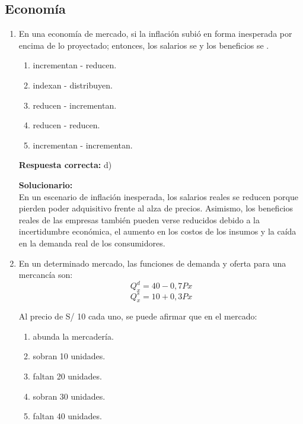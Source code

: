 \subsection*{Economía}

\begin{enumerate}
	
\item En una economía de mercado, si la inflación subió en forma inesperada por encima de lo proyectado; entonces, los salarios se \underline{\hspace{2cm}} y los beneficios se \underline{\hspace{2cm}}.

\begin{enumerate}[label=\alph*)]
	\item incrementan - reducen.
	\item indexan - distribuyen.
	\item reducen - incrementan.
	\item reducen - reducen.
	\item incrementan - incrementan.
\end{enumerate}

\textbf{Respuesta correcta:} d)

\vspace{2mm}
\textbf{Solucionario:}\\

En un escenario de inflación inesperada, los salarios reales se reducen porque pierden poder adquisitivo frente al alza de precios. Asimismo, los beneficios reales de las empresas también pueden verse reducidos debido a la incertidumbre económica, el aumento en los costos de los insumos y la caída en la demanda real de los consumidores.

\vspace{6mm}

\item En un determinado mercado, las funciones de demanda y oferta para una mercancía son:
\[ Q_x^d = 40 - 0,7Px \]
\[ Q_x^s = 10 + 0,3Px \]

Al precio de S/ 10 cada uno, se puede afirmar que en el mercado:

\begin{enumerate}[label=\alph*)]
	\item abunda la mercadería.
	\item sobran 10 unidades.
	\item faltan 20 unidades.
	\item sobran 30 unidades.
	\item faltan 40 unidades.
\end{enumerate}


\end{enumerate}
